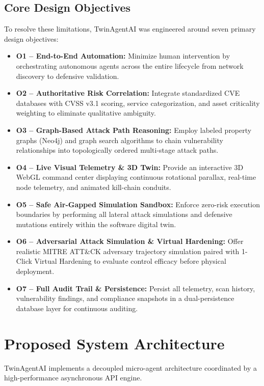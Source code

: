 \documentclass[conference]{IEEEtran}
\begin{document}
\subsection{Core Design Objectives}
To resolve these limitations, TwinAgentAI was engineered around seven primary design objectives:
\begin{itemize}
    \item \textbf{O1 -- End-to-End Automation:} Minimize human intervention by orchestrating autonomous agents across the entire lifecycle from network discovery to defensive validation.
    \item \textbf{O2 -- Authoritative Risk Correlation:} Integrate standardized CVE databases with CVSS v3.1 scoring, service categorization, and asset criticality weighting to eliminate qualitative ambiguity.
    \item \textbf{O3 -- Graph-Based Attack Path Reasoning:} Employ labeled property graphs (Neo4j) and graph search algorithms to chain vulnerability relationships into topologically ordered multi-stage attack paths.
    \item \textbf{O4 -- Live Visual Telemetry \& 3D Twin:} Provide an interactive 3D WebGL command center displaying continuous rotational parallax, real-time node telemetry, and animated kill-chain conduits.
    \item \textbf{O5 -- Safe Air-Gapped Simulation Sandbox:} Enforce zero-risk execution boundaries by performing all lateral attack simulations and defensive mutations entirely within the software digital twin.
    \item \textbf{O6 -- Adversarial Attack Simulation \& Virtual Hardening:} Offer realistic MITRE ATT\&CK adversary trajectory simulation paired with 1-Click Virtual Hardening to evaluate control efficacy before physical deployment.
    \item \textbf{O7 -- Full Audit Trail \& Persistence:} Persist all telemetry, scan history, vulnerability findings, and compliance snapshots in a dual-persistence database layer for continuous auditing.
\end{itemize}

\section{Proposed System Architecture}
TwinAgentAI implements a decoupled micro-agent architecture coordinated by a high-performance asynchronous API engine. 
\end{document}

